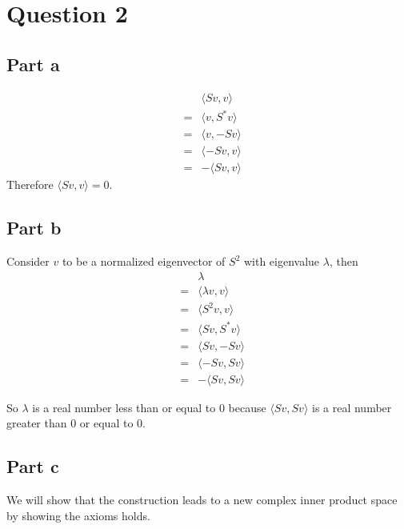 \section*{Question 2}
\subsection*{Part a}
\begin{eqnarray*}
    & & \langle Sv , v \rangle     \\
    &=& \langle v , S^* v \rangle  \\
    &=& \langle v , -Sv \rangle   \\
    &=& \langle -Sv , v \rangle   \\
    &=& - \langle Sv , v \rangle
\end{eqnarray*}
Therefore $ \langle Sv , v \rangle = 0 $.

\subsection*{Part b}
Consider $ v $ to be a normalized eigenvector of $ S^2 $ with eigenvalue $ \lambda $, then
\begin{eqnarray*}
    & & \lambda \\
    &=& \langle \lambda v , v \rangle     \\
    &=& \langle S^2v , v \rangle     \\
    &=& \langle Sv , S^* v \rangle  \\
    &=& \langle Sv , -Sv \rangle   \\
    &=& \langle -Sv , Sv \rangle   \\
    &=& - \langle Sv , Sv \rangle
\end{eqnarray*}

So $ \lambda $ is a real number less than or equal to 0 because $ \langle Sv , Sv \rangle $ is a real number greater than 0 or equal to 0.

\subsection*{Part c}
We will show that the construction leads to a new complex inner product space by showing the axioms holds.

